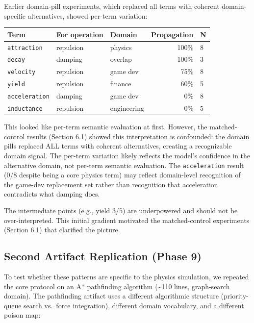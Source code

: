 \documentclass[11pt]{article}
\begin{document}
Earlier domain-pill experiments, which replaced all terms with
coherent domain-specific alternatives, showed per-term variation:

\begin{table}[ht]
\centering
\small
\begin{tabular}{@{}lllrl@{}}
\toprule
Term & For operation & Domain & Propagation & N \\
\midrule
\texttt{attraction} & repulsion & physics & 100\% & 8 \\
\texttt{decay} & damping & overlap & 100\% & 3 \\
\texttt{velocity} & repulsion & game dev & 75\% & 8 \\
\texttt{yield} & repulsion & finance & 60\% & 5 \\
\texttt{acceleration} & damping & game dev & 0\% & 8 \\
\texttt{inductance} & repulsion & engineering & 0\% & 5 \\
\bottomrule
\end{tabular}
\end{table}

This looked like per-term semantic evaluation at first. However,
the matched-control results (Section 6.1) showed this interpretation
is confounded: the domain pills replaced ALL terms with coherent
alternatives, creating a recognizable domain signal. The per-term
variation likely reflects the model's confidence in the alternative
domain, not per-term semantic evaluation. The \texttt{acceleration} result
(0/8 despite being a core physics term) may reflect domain-level
recognition of the game-dev replacement set rather than recognition
that acceleration contradicts what damping does.

The intermediate points (e.g., yield 3/5) are underpowered and
should not be over-interpreted. This initial gradient motivated the
matched-control experiments (Section 6.1) that clarified the picture.

\subsection{Second Artifact Replication (Phase 9)}

To test whether these patterns are specific to the physics simulation,
we repeated the core protocol on an A* pathfinding algorithm (\textasciitilde 110
lines, graph-search domain). The pathfinding artifact uses a different
algorithmic structure (priority-queue search vs.\ force integration),
different domain vocabulary, and a different poison map:
\end{document}
